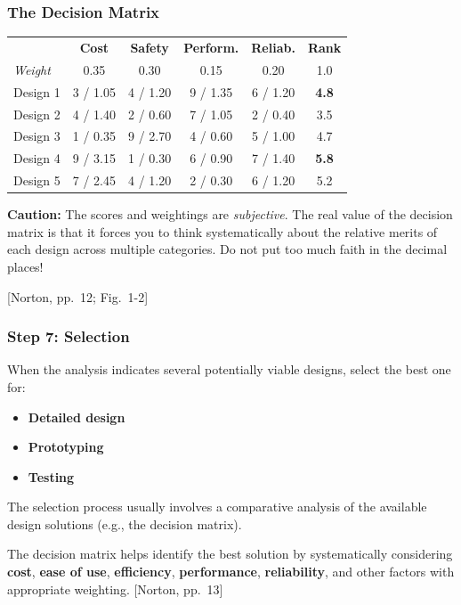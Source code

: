 \documentclass[10pt,aspectratio=43]{beamer}
\newcommand{\pref}[1]{\vfill\hfill{\scriptsize\color{gray}[Norton, pp.~#1]}}
\begin{document}
\begin{frame}
\frametitle{The Decision Matrix}

\begin{center}
\small
\begin{tabular}{l|c|c|c|c|c}
\toprule
 & \textbf{Cost} & \textbf{Safety} & \textbf{Perform.} & \textbf{Reliab.} & \textbf{Rank} \\
\textit{Weight} & 0.35 & 0.30 & 0.15 & 0.20 & 1.0 \\
\midrule
Design 1 & 3 / 1.05 & 4 / 1.20 & 9 / 1.35 & 6 / 1.20 & \textbf{4.8} \\
Design 2 & 4 / 1.40 & 2 / 0.60 & 7 / 1.05 & 2 / 0.40 & 3.5 \\
Design 3 & 1 / 0.35 & 9 / 2.70 & 4 / 0.60 & 5 / 1.00 & 4.7 \\
Design 4 & 9 / 3.15 & 1 / 0.30 & 6 / 0.90 & 7 / 1.40 & \textbf{5.8} \\
Design 5 & 7 / 2.45 & 4 / 1.20 & 2 / 0.30 & 6 / 1.20 & 5.2 \\
\bottomrule
\end{tabular}
\end{center}

\vspace{6pt}
\begin{redbox}
\textbf{Caution:} The scores and weightings are \emph{subjective}. The real value of the decision matrix is that it forces you to think systematically about the relative merits of each design across multiple categories. Do not put too much faith in the decimal places!
\end{redbox}
\pref{12; Fig.~1-2}
\end{frame}

\begin{frame}
\frametitle{Step 7: Selection}

When the analysis indicates several potentially viable designs, select the best one for:
\begin{itemize}
  \item \textbf{Detailed design}
  \item \textbf{Prototyping}
  \item \textbf{Testing}
\end{itemize}

\vspace{6pt}
The selection process usually involves a comparative analysis of the available design solutions (e.g., the decision matrix).

\vspace{6pt}
The decision matrix helps identify the best solution by systematically considering \textbf{cost}, \textbf{ease of use}, \textbf{efficiency}, \textbf{performance}, \textbf{reliability}, and other factors with appropriate weighting.
\pref{13}
\end{frame}
\end{document}
